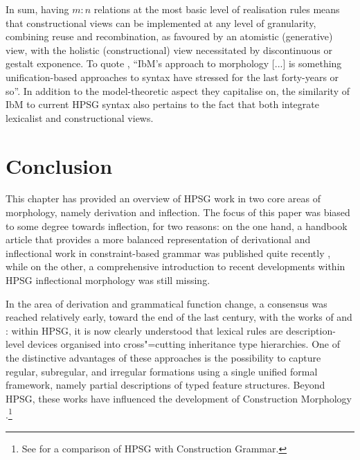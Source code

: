 \documentclass[output=paper
 	        ,biblatex
                ,babelshorthands
                ,newtxmath
                ,draftmode
                ,colorlinks, citecolor=brown
]{langscibook}
\begin{document}
\begin{exe}
\begin{xlist}
\begin{exe}
\begin{xlist}
\bigskip\noindent In sum, having $m:n$ relations at the most basic
level of realisation rules means that constructional views can be
implemented at any level of granularity, combining reuse and
recombination, as favoured by an atomistic (generative) view, with the
holistic (constructional) view necessitated by discontinuous or
gestalt exponence.  To quote \citet{diaz:koenig:michelson:19}, ``IbM’s
approach to morphology [...] is something unification-based approaches
to syntax have stressed for the last forty-years or so''. In addition
to the model-theoretic aspect they capitalise on, the similarity of
IbM to current HPSG syntax also pertains to the fact that both integrate
lexicalist and constructional views.

\section{Conclusion}

This chapter has provided an overview of HPSG work in two core areas
of morphology, namely derivation and inflection. The focus of this
paper was biased to some degree towards inflection, for two reasons:
on the one hand, a handbook article that provides a more balanced
representation of derivational and inflectional work in
constraint-based grammar was published quite recently
\citep{Bonami15b}, while on the other, a comprehensive introduction
to recent developments within HPSG inflectional morphology was still
missing.

In the area of derivation and grammatical function change, a consensus
was reached relatively early, toward the end of the last century, with
the works of \citet{Riehemann98} and \cite{Koenig99}: within HPSG, it
is now clearly understood that lexical rules are description-level
devices organised into cross"=cutting inheritance type
hierarchies. One of the distinctive advantages of these approaches is
the possibility to capture regular, subregular, and irregular
formations using a single unified formal framework, namely partial
descriptions of typed feature structures. Beyond HPSG, these works have
influenced the development of Construction Morphology \citep{Booij10}.\footnote{See  for a comparison of HPSG with Construction Grammar.}


\end{xlist}
\end{exe}
\end{xlist}
\end{exe}
\end{document}
